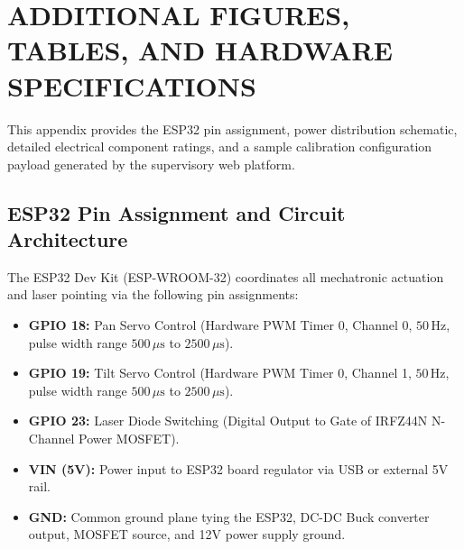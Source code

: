 \chapter{ADDITIONAL FIGURES, TABLES, AND HARDWARE SPECIFICATIONS}

This appendix provides the ESP32 pin assignment, power distribution schematic, detailed electrical component ratings, and a sample calibration configuration payload generated by the supervisory web platform.

\section{ESP32 Pin Assignment and Circuit Architecture}
The ESP32 Dev Kit (ESP-WROOM-32) coordinates all mechatronic actuation and laser pointing via the following pin assignments:
\begin{itemize}
    \item \textbf{GPIO 18:} Pan Servo Control (Hardware PWM Timer 0, Channel 0, $50\,\text{Hz}$, pulse width range $500\,\mu\text{s}$ to $2500\,\mu\text{s}$).
    \item \textbf{GPIO 19:} Tilt Servo Control (Hardware PWM Timer 0, Channel 1, $50\,\text{Hz}$, pulse width range $500\,\mu\text{s}$ to $2500\,\mu\text{s}$).
    \item \textbf{GPIO 23:} Laser Diode Switching (Digital Output to Gate of IRFZ44N N-Channel Power MOSFET).
    \item \textbf{VIN (5V):} Power input to ESP32 board regulator via USB or external 5V rail.
    \item \textbf{GND:} Common ground plane tying the ESP32, DC-DC Buck converter output, MOSFET source, and 12V power supply ground.
\end{itemize}

